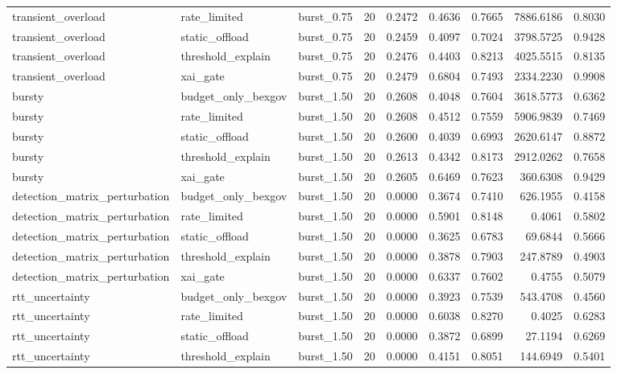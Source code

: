 \begin{table}[t]
\begin{tabular}{lllrrrrrr}
transient\_overload & rate\_limited & burst\_0.75 & 20 & 0.2472 & 0.4636 & 0.7665 & 7886.6186 & 0.8030 \\
transient\_overload & static\_offload & burst\_0.75 & 20 & 0.2459 & 0.4097 & 0.7024 & 3798.5725 & 0.9428 \\
transient\_overload & threshold\_explain & burst\_0.75 & 20 & 0.2476 & 0.4403 & 0.8213 & 4025.5515 & 0.8135 \\
transient\_overload & xai\_gate & burst\_0.75 & 20 & 0.2479 & 0.6804 & 0.7493 & 2334.2230 & 0.9908 \\
bursty & budget\_only\_bexgov & burst\_1.50 & 20 & 0.2608 & 0.4048 & 0.7604 & 3618.5773 & 0.6362 \\
bursty & rate\_limited & burst\_1.50 & 20 & 0.2608 & 0.4512 & 0.7559 & 5906.9839 & 0.7469 \\
bursty & static\_offload & burst\_1.50 & 20 & 0.2600 & 0.4039 & 0.6993 & 2620.6147 & 0.8872 \\
bursty & threshold\_explain & burst\_1.50 & 20 & 0.2613 & 0.4342 & 0.8173 & 2912.0262 & 0.7658 \\
bursty & xai\_gate & burst\_1.50 & 20 & 0.2605 & 0.6469 & 0.7623 & 360.6308 & 0.9429 \\
detection\_matrix\_perturbation & budget\_only\_bexgov & burst\_1.50 & 20 & 0.0000 & 0.3674 & 0.7410 & 626.1955 & 0.4158 \\
detection\_matrix\_perturbation & rate\_limited & burst\_1.50 & 20 & 0.0000 & 0.5901 & 0.8148 & 0.4061 & 0.5802 \\
detection\_matrix\_perturbation & static\_offload & burst\_1.50 & 20 & 0.0000 & 0.3625 & 0.6783 & 69.6844 & 0.5666 \\
detection\_matrix\_perturbation & threshold\_explain & burst\_1.50 & 20 & 0.0000 & 0.3878 & 0.7903 & 247.8789 & 0.4903 \\
detection\_matrix\_perturbation & xai\_gate & burst\_1.50 & 20 & 0.0000 & 0.6337 & 0.7602 & 0.4755 & 0.5079 \\
rtt\_uncertainty & budget\_only\_bexgov & burst\_1.50 & 20 & 0.0000 & 0.3923 & 0.7539 & 543.4708 & 0.4560 \\
rtt\_uncertainty & rate\_limited & burst\_1.50 & 20 & 0.0000 & 0.6038 & 0.8270 & 0.4025 & 0.6283 \\
rtt\_uncertainty & static\_offload & burst\_1.50 & 20 & 0.0000 & 0.3872 & 0.6899 & 27.1194 & 0.6269 \\
rtt\_uncertainty & threshold\_explain & burst\_1.50 & 20 & 0.0000 & 0.4151 & 0.8051 & 144.6949 & 0.5401 \\

\end{tabular}
\end{table}
